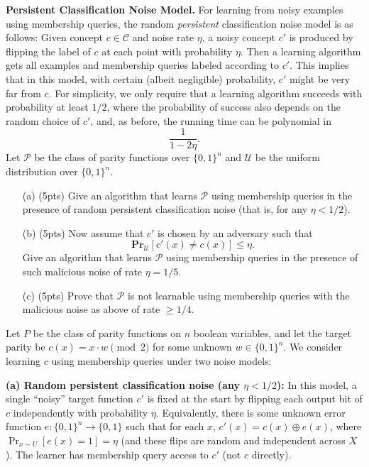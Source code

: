 \documentclass[11pt]{article}
\DeclareMathOperator{\1}{\mathbbm{1}}
\begin{document}
\begin{problem} [15 pts] \textbf{Persistent Classification Noise Model.}
For learning from noisy examples using membership queries, the random \textit{persistent} classification noise model is as follows: Given concept $c \in \mathcal{C}$ and noise rate $\eta$, a noisy concept $c'$ is produced by flipping the label of $c$ at each point with probability $\eta$. Then a learning algorithm gets all examples and membership queries labeled according to $c'$. This implies that in this model, with certain (albeit negligible) probability, $c'$ might be very far from $c$. For simplicity, we only require that a learning algorithm succeeds with probability at least $1/2$, where the probability of success also depends on the random choice of $c'$, and, as before, the running time can be polynomial in 
\[
\frac{1}{1-2\eta}.
\]
Let $\mathcal{P}$ be the class of parity functions over $\{0,1\}^n$ and $\mathcal{U}$ be the uniform distribution over $\{0,1\}^n$.

\begin{enumerate}
    \item[(a)] (5pts) Give an algorithm that learns $\mathcal{P}$ using membership queries in the presence of random persistent classification noise (that is, for any $\eta < 1/2$).
    \item[(b)] (5pts) Now assume that $c'$ is chosen by an adversary such that 
    \[
    \mathbf{Pr}_{\mathcal{U}}[c'(x) \neq c(x)] \leq \eta.
    \]
    Give an algorithm that learns $\mathcal{P}$ using membership queries in the presence of such malicious noise of rate $\eta = 1/5$.
    \item[(c)] (5pts) Prove that $\mathcal{P}$ is not learnable using membership queries with the malicious noise as above of rate $\geq 1/4$.
\end{enumerate}
\end{problem}

Let $P$ be the class of parity functions on $n$ boolean variables, and let the target parity be $c(x) = x \cdot w \pmod{2}$ for some unknown $w \in \{0,1\}^n$. We consider learning $c$ using membership queries under two noise models:

\textbf{(a) Random persistent classification noise (any $\eta < 1/2$):} In this model, a single “noisy” target function $c'$ is fixed at the start by flipping each output bit of $c$ independently with probability $\eta$. Equivalently, there is some unknown error function $e: \{0,1\}^n \to \{0,1\}$ such that for each $x$, $c'(x) = c(x) \oplus e(x)$, where $\Pr_{x\sim U}[e(x)=1] = \eta$ (and these flips are random and independent across $X$). The learner has membership query access to $c'$ (not $c$ directly).
\end{document}
